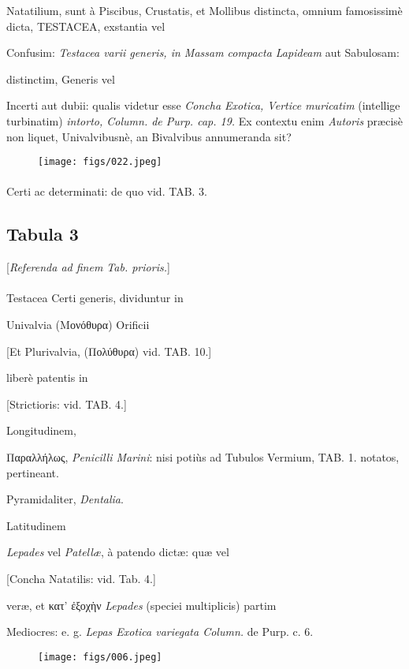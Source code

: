 \documentclass[a4paper, 11pt, oneside, polutonikogreek, german]{article}
\begin{document}
Natatilium, sunt à Piscibus, Crustatis, et Mollibus distincta, omnium famosissimè dicta, TESTACEA, exstantia vel

Confusim: \emph{Testacea varii generis, in Massam compacta Lapideam} aut Sabulosam:

distinctim, Generis vel

Incerti aut dubii: qualis videtur esse \emph{Concha Exotica, Vertice muricatim} (intellige turbinatim) \emph{intorto, Column. de Purp. cap. 19.} Ex contextu enim \emph{Autoris} præcisè non liquet, Univalvibusnè, an Bivalvibus annumeranda sit?
\begin{figure}[H]
\centering
\texttt{[image: figs/022.jpeg]}
\end{figure}
\paragraph{}

Certi ac determinati: de quo vid. TAB. 3.
\clearpage
\subsection{Tabula 3}
\begin{center}
[\emph{Referenda ad finem Tab. prioris.}]
\end{center}
\paragraph{}
Testacea Certi generis, dividuntur in

Univalvia (Μονόθυρα) Orificii

[Et Plurivalvia, (Πολύθυρα) vid. TAB. 10.]

liberè patentis in

[Strictioris: vid. TAB. 4.]

Longitudinem,

Παραλλήλως, \emph{Penicilli Marini}: nisi potiùs ad Tubulos Vermium, TAB. 1. notatos, pertineant.

Pyramidaliter, \emph{Dentalia}.

Latitudinem

\emph{Lepades} vel \emph{Patellæ}, à patendo dictæ: quæ vel

[Concha Natatilis: vid. Tab. 4.]

veræ, et κατ' ἐξοχὴν \emph{Lepades} (speciei multiplicis) partim

Mediocres: e. g. \emph{Lepas Exotica variegata Column.} de Purp. c. 6.
\begin{figure}[H]
\centering
\texttt{[image: figs/006.jpeg]}
\end{figure}
\end{document}
